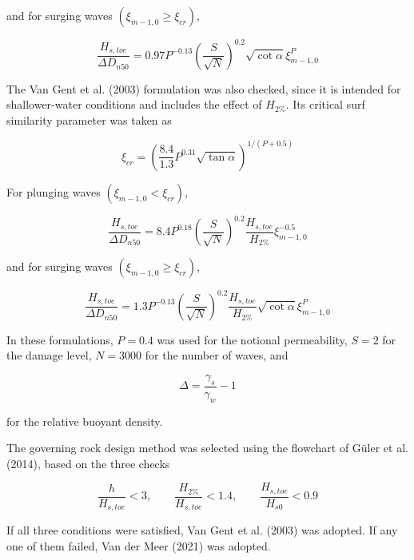 \documentclass[a4paper, 11pt]{article}
\begin{document}
and for surging waves \((\xi_{m-1,0}\geq\xi_{cr})\),

\begin{equation}
    \frac{H_{s,toe}}{\Delta D_{n50}}
    =
    0.97P^{-0.13}
    \left(\frac{S}{\sqrt{N}}\right)^{0.2}
    \sqrt{\cot\alpha}\xi_{m-1,0}^{P}
\end{equation}

The Van Gent et al. (2003) formulation was also checked, since it is intended for shallower-water conditions and includes the effect of \(H_{2\%}\). Its critical surf similarity parameter was taken as

\begin{equation}
    \xi_{cr}=
    \left(\frac{8.4}{1.3}P^{0.31}\sqrt{\tan\alpha}\right)^{1/(P+0.5)}
\end{equation}

For plunging waves \((\xi_{m-1,0}<\xi_{cr})\),

\begin{equation}
    \frac{H_{s,toe}}{\Delta D_{n50}}
    =
    8.4P^{0.18}
    \left(\frac{S}{\sqrt{N}}\right)^{0.2}
    \frac{H_{s,toe}}{H_{2\%}}
    \xi_{m-1,0}^{-0.5}
\end{equation}

and for surging waves \((\xi_{m-1,0}\geq\xi_{cr})\),

\begin{equation}
    \frac{H_{s,toe}}{\Delta D_{n50}}
    =
    1.3P^{-0.13}
    \left(\frac{S}{\sqrt{N}}\right)^{0.2}
    \frac{H_{s,toe}}{H_{2\%}}
    \sqrt{\cot\alpha}\xi_{m-1,0}^{P}
\end{equation}

In these formulations, \(P=0.4\) was used for the notional permeability, \(S=2\) for the damage level, \(N=3000\) for the number of waves, and

\begin{equation}
    \Delta=\frac{\gamma_s}{\gamma_w}-1
\end{equation}

for the relative buoyant density.

The governing rock design method was selected using the flowchart of G\"uler et al. (2014), based on the three checks

\begin{equation}
    \frac{h}{H_{s,toe}}<3, \qquad
    \frac{H_{2\%}}{H_{s,toe}}<1.4, \qquad
    \frac{H_{s,toe}}{H_{s0}}<0.9
\end{equation}

If all three conditions were satisfied, Van Gent et al. (2003) was adopted. If any one of them failed, Van der Meer (2021) was adopted.
\end{document}
